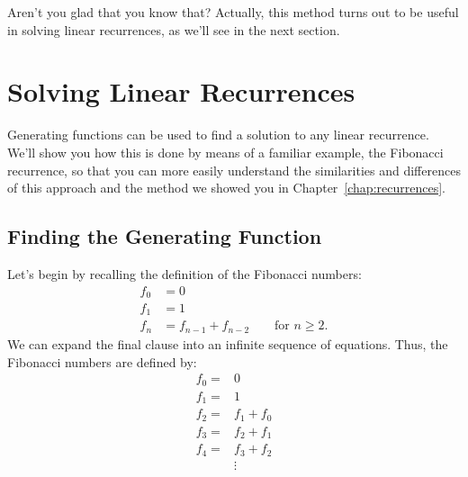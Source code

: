 Aren't you glad that you know that?  Actually, this method turns out
to be useful in solving linear recurrences, as we'll see in the next
section.

\section{Solving Linear Recurrences}

Generating functions can be used to find a solution to any linear
recurrence.  We'll show you how this is done by means of a familiar
example, the Fibonacci recurrence, so that you can more easily
understand the similarities and differences of this approach and the
method we showed you in Chapter~\ref{chap:recurrences}.

\subsection{Finding the Generating Function}

Let's begin by recalling the definition of the Fibonacci numbers:
%
\begin{align*}
f_0 & = 0 \\
f_1 & = 1 \\
f_n & = f_{n-1} + f_{n-2} \qquad\text{for $n \geq 2$}.
\end{align*}
%
We can expand the final clause into an infinite sequence of equations.
Thus, the Fibonacci numbers are defined by:
%
\begin{align*}
f_0 = & 0 \\
f_1 = & 1 \\
f_2 = & f_1 + f_0 \\
f_3 = & f_2 + f_1 \\
f_4 = & f_3 + f_2 \\
      & \vdots
\end{align*}

